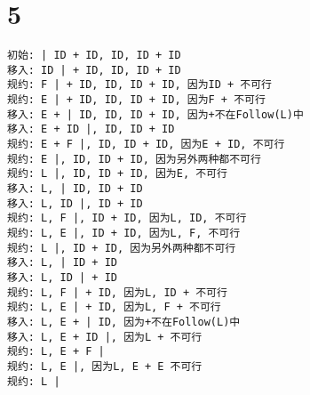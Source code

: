 \documentclass[12pt]{article}
\begin{document}
  \section*{5}

    \begin{lstlisting}
初始: | ID + ID, ID, ID + ID
移入: ID | + ID, ID, ID + ID
规约: F | + ID, ID, ID + ID, 因为ID + 不可行
规约: E | + ID, ID, ID + ID, 因为F + 不可行
移入: E + | ID, ID, ID + ID, 因为+不在Follow(L)中
移入: E + ID |, ID, ID + ID
规约: E + F |, ID, ID + ID, 因为E + ID, 不可行
规约: E |, ID, ID + ID, 因为另外两种都不可行
规约: L |, ID, ID + ID, 因为E, 不可行
移入: L, | ID, ID + ID
移入: L, ID |, ID + ID
规约: L, F |, ID + ID, 因为L, ID, 不可行
规约: L, E |, ID + ID, 因为L, F, 不可行
规约: L |, ID + ID, 因为另外两种都不可行
移入: L, | ID + ID
移入: L, ID | + ID
规约: L, F | + ID, 因为L, ID + 不可行
规约: L, E | + ID, 因为L, F + 不可行
移入: L, E + | ID, 因为+不在Follow(L)中
移入: L, E + ID |, 因为L + 不可行
规约: L, E + F |
规约: L, E |, 因为L, E + E 不可行
规约: L |
    \end{lstlisting}
\end{document}
